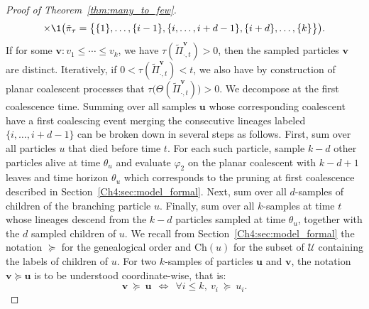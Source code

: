 \begin{refsegment}
\begin{proof}[Proof of Theorem~\ref{thm:many_to_few}]
\begin{multline*}
\times\1\big( \tilde\pi_{\tau}= \big\{\{1\},\ldots,\{i-1\},\{i,\ldots, i+d-1\},\{i+d\},\ldots,\{k\}\big\}\big).
\end{multline*}
If for some $\bm v: v_1\leq \cdots\leq v_k$, we have $\tau(\tilde\Pi^{\bm v}_{\cdot,t}) > 0$, then the sampled particles $\bm{v}$ are distinct. Iteratively, if $0<\tau(\tilde\Pi^{\bm v}_{\cdot,t})<t$, we also have by construction of planar coalescent processes that $\tau\big(\Theta(\tilde\Pi^{\bm v}_{\cdot,t})\big) > 0$.
We decompose at the first coalescence time. Summing over all samples $\bm{u}$ whose corresponding coalescent have a first coalescing event merging the consecutive lineages labeled $\{i,\ldots, i+d-1\}$ can be broken down in several steps as follows.
First, sum over all particles $u$ that died before time $t$. For each such particle, sample $k-d$ other particles alive at time $\theta_u$ and evaluate $\varphi_2$ on the planar coalescent with $k-d+1$ leaves and time horizon $\theta_u$ which corresponds to the pruning at first coalescence described in Section~\ref{Ch4:sec:model_formal}. Next, sum over all $d$-samples of children of the branching particle $u$. Finally, sum over all $k$-samples at time $t$ whose lineages descend from the $k-d$ particles sampled at time $\theta_u$, together with the $d$ sampled children of $u$. 
We recall from Section~\ref{Ch4:sec:model_formal} the notation $\succcurlyeq$ for the genealogical order and $\mathrm{Ch}(u)$ for the subset of $\mathcal{U}$ containing the labels of children of $u$.
For two $k$-samples of particles $\bm u$ and $\bm v$, the notation $\bm v \succcurlyeq \bm u$  is to be understood coordinate-wise, that is:
\[
 \bm v\ \succcurlyeq\  \bm u \ \ \Longleftrightarrow\  \ \forall i\leq k,\ v_i\ \succcurlyeq\ u_i.
\]



\end{proof}
\end{refsegment}
